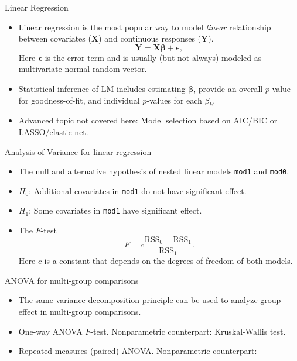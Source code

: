 \begin{frame}{Linear Regression}
  \begin{itemize}
  \item Linear regression is the most popular way to model
    \emph{linear} relationship between covariates ($\mathbf{X}$) and
    continuous responses ($\mathbf{Y}$).
    \begin{equation}
      \label{eq:lin-mod}
      \mathbf{Y} = \mathbf{X} \bm{\beta} + \bm{\epsilon},
    \end{equation}
    Here $\bm{\epsilon}$ is the error term and is usually (but not
    always) modeled as multivariate normal random vector.
  \item Statistical inference of LM includes estimating $\bm{\beta}$,
    provide an overall $p$-value for goodness-of-fit, and individual
    $p$-values for each $\beta_{k}$.
  \item Advanced topic not covered here: Model selection based on
    AIC/BIC or LASSO/elastic net.
  \end{itemize}
\end{frame}

\begin{frame}{Analysis of Variance for linear regression}
  \begin{itemize}
  \item The null and alternative hypothesis of nested linear models \texttt{mod1} and \texttt{mod0}.
  \item $H_{0}$: Additional covariates in \texttt{mod1} do not have significant effect.
  \item $H_{1}$: Some covariates in \texttt{mod1} have significant effect.
  \item The $F$-test
    \begin{equation}
      \label{eq:Ftest}
      F = c \frac{\mathrm{RSS}_{0} - \mathrm{RSS}_{1}}{\mathrm{RSS}_{1}}.
    \end{equation}
    Here $c$ is a constant that depends on the degrees of freedom of
    both models.
  \end{itemize}
\end{frame}

\begin{frame}{ANOVA for multi-group comparisons}
  \begin{itemize}
  \item The same variance decomposition principle can be used to
    analyze group-effect in multi-group comparisons.
  \item One-way ANOVA $F$-test. Nonparametric counterpart: Kruskal-Wallis test.
  \item Repeated measures (paired) ANOVA. Nonparametric counterpart: 
  \end{itemize}
\end{frame}

